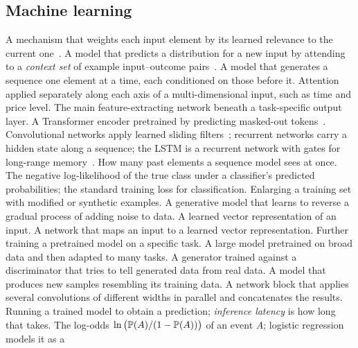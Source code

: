 \subsection{Machine learning}
\begin{description}[leftmargin=1.2em,style=sameline,itemsep=1pt,font=\normalfont\bfseries]
 A mechanism that weights each input element by its learned relevance to the current
  one~\citep{vaswani2017}.
 A model that predicts a distribution for a new input by attending to
  a \emph{context set} of example input--outcome pairs~\citep{kim2019anp}.
 A model that generates a sequence one element at a time, each conditioned
  on those before it.
 Attention applied separately along each axis of a multi-dimensional input, such as time and price level.
 The main feature-extracting network beneath a task-specific output layer.
 A Transformer encoder pretrained by predicting masked-out tokens~\citep{devlin2019}.
 Convolutional networks apply learned sliding filters~\citep{lecun2015};
  recurrent networks carry a hidden state along a sequence; the LSTM is a recurrent network with
  gates for long-range memory~\citep{hochreiter1997}.
 How many past elements a sequence model sees at once.
 The negative log-likelihood of the true class under a classifier's predicted
  probabilities; the standard training loss for classification.
 Enlarging a training set with modified or synthetic examples.
 A generative model that learns to reverse a gradual process of adding noise to data.
 A learned vector representation of an input.
 A network that maps an input to a learned vector representation.
 Further training a pretrained model on a specific task.
 A large model pretrained on broad data and then adapted to many tasks.
 A generator trained against a discriminator that tries to tell generated data from real data.
 A model that produces new samples resembling its training data.
 A network block that applies several convolutions of different widths in parallel and concatenates the results.
 Running a trained model to obtain a prediction; \emph{inference latency} is how long
  that takes.
 The log-odds $\ln\big(\P(A)/(1-\P(A))\big)$ of an event $A$; logistic regression models it as a

\end{description}
